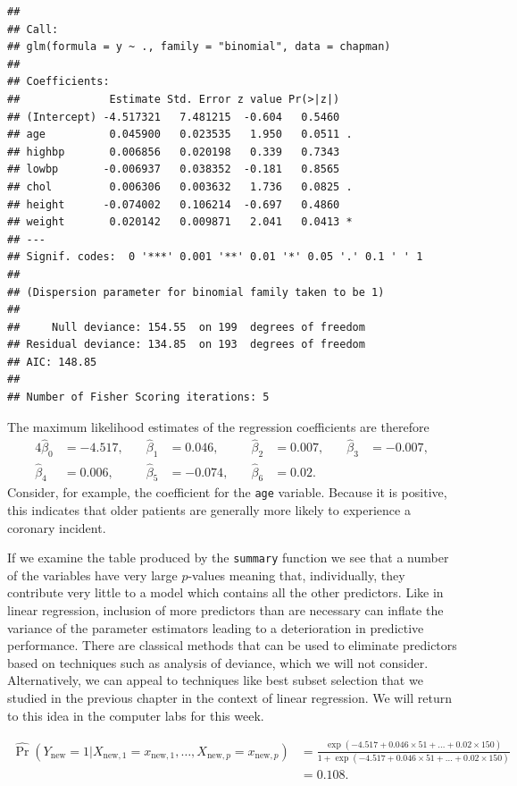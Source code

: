 \documentclass[
]{article}
\begin{document}
\begin{verbatim}
## 
## Call:
## glm(formula = y ~ ., family = "binomial", data = chapman)
## 
## Coefficients:
##              Estimate Std. Error z value Pr(>|z|)  
## (Intercept) -4.517321   7.481215  -0.604   0.5460  
## age          0.045900   0.023535   1.950   0.0511 .
## highbp       0.006856   0.020198   0.339   0.7343  
## lowbp       -0.006937   0.038352  -0.181   0.8565  
## chol         0.006306   0.003632   1.736   0.0825 .
## height      -0.074002   0.106214  -0.697   0.4860  
## weight       0.020142   0.009871   2.041   0.0413 *
## ---
## Signif. codes:  0 '***' 0.001 '**' 0.01 '*' 0.05 '.' 0.1 ' ' 1
## 
## (Dispersion parameter for binomial family taken to be 1)
## 
##     Null deviance: 154.55  on 199  degrees of freedom
## Residual deviance: 134.85  on 193  degrees of freedom
## AIC: 148.85
## 
## Number of Fisher Scoring iterations: 5
\end{verbatim}

The maximum likelihood estimates of the regression coefficients are
therefore \begin{alignat*}{4}
\hat{\beta}_0&=-4.517,&\quad \hat{\beta}_1&=0.046,&\quad \hat{\beta}_2&=0.007,&\quad \hat{\beta}_3&=-0.007,\\
\hat{\beta}_4&=0.006,&\quad \hat{\beta}_5&=-0.074,&\quad \hat{\beta}_6&=0.02.&&
\end{alignat*} Consider, for example, the coefficient for the
\texttt{age} variable. Because it is positive, this indicates that older
patients are generally more likely to experience a coronary incident.

If we examine the table produced by the \texttt{summary} function we see
that a number of the variables have very large \(p\)-values meaning
that, individually, they contribute very little to a model which
contains all the other predictors. Like in linear regression, inclusion
of more predictors than are necessary can inflate the variance of the
parameter estimators leading to a deterioration in predictive
performance. There are classical methods that can be used to eliminate
predictors based on techniques such as analysis of deviance, which we
will not consider. Alternatively, we can appeal to techniques like best
subset selection that we studied in the previous chapter in the context
of linear regression. We will return to this idea in the computer labs
for this week.

\begin{align*}
\hat{\Pr}(Y_{\text{new}} = 1 | X_{\text{new},1}=x_{\text{new},1}, \ldots, X_{\text{new},p}=x_{\text{new},p}) &= \frac{\exp(-4.517 + 0.046 \times 51 + \ldots + 0.02 \times 150)}{1 + \exp(-4.517 + 0.046 \times 51 + \ldots + 0.02 \times 150)}\\
&= 0.108.
\end{align*}
\end{document}
